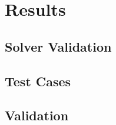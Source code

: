 \section{Results}


\subsection{Solver Validation}


\subsection{Test Cases}



\subsection{Validation}